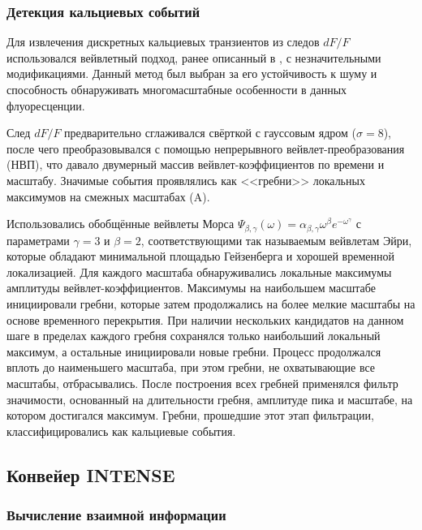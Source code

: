 \subsubsection{Детекция кальциевых событий}
\label{sec:calcium_event_detection}
Для извлечения дискретных кальциевых транзиентов из следов $dF/F$ использовался вейвлетный подход, ранее описанный в \cite{Neugornet2021}, с незначительными модификациями. Данный метод был выбран за его устойчивость к шуму и способность обнаруживать многомасштабные особенности в данных флуоресценции.

След $dF/F$ предварительно сглаживался свёрткой с гауссовым ядром ($\sigma =
8$), после чего преобразовывался с помощью непрерывного вейвлет-преобразования (НВП), что давало двумерный массив вейвлет-коэффициентов по времени и масштабу. Значимые события проявлялись как <<гребни>> локальных максимумов на смежных масштабах (A).

Использовались обобщённые вейвлеты Морса $\Psi_{\beta,\gamma}(\omega) =
\alpha_{\beta,\gamma}\omega^{\beta}e^{-\omega^{\gamma}}$ с параметрами $\gamma =
3$ и $\beta = 2$, соответствующими так называемым вейвлетам Эйри, которые обладают минимальной площадью Гейзенберга и хорошей временной локализацией.
Для каждого масштаба обнаруживались локальные максимумы амплитуды вейвлет-коэффициентов. Максимумы на наибольшем масштабе инициировали гребни, которые затем продолжались на более мелкие масштабы на основе временного перекрытия. При наличии нескольких кандидатов на данном шаге в пределах каждого гребня сохранялся только наибольший локальный максимум, а остальные инициировали новые гребни. Процесс продолжался вплоть до наименьшего масштаба, при этом гребни, не охватывающие все масштабы, отбрасывались.
После построения всех гребней применялся фильтр значимости, основанный на длительности гребня, амплитуде пика и масштабе, на котором достигался максимум. Гребни, прошедшие этот этап фильтрации, классифицировались как кальциевые события.

\subsection{Конвейер INTENSE}
\label{sec:intense_pipeline}

\subsubsection{Вычисление взаимной информации}
\label{sec:mi_computation}


